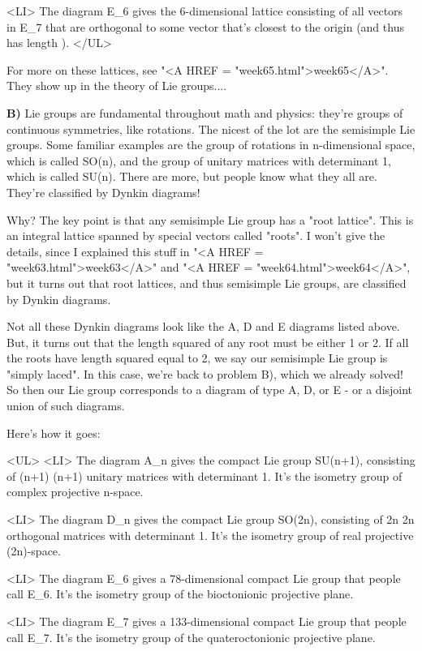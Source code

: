 <LI>
The diagram E_{6} gives the 6-dimensional lattice consisting
of all vectors in E_{7} that are orthogonal to some vector
that's closest to the origin (and thus has length ).
</UL>

For more on these lattices, see "<A HREF = "week65.html">week65</A>".
They show up in the theory of Lie groups....

\textbf{B)} Lie groups are fundamental throughout math and physics: they're
groups of continuous symmetries, like rotations.  The nicest of the
lot are the semisimple Lie groups.  Some familiar examples are the 
group of rotations in n-dimensional space, which is called SO(n), 
and the group of unitary matrices with determinant 1, which is 
called SU(n).  There are more, but people know what they all are.
They're classified by Dynkin diagrams!  

Why?  The key point is that any semisimple Lie group 
has a "root lattice".  
This is an integral lattice spanned by special vectors 
called "roots".  
I won't give the details, since I explained this 
stuff in "<A HREF = "week63.html">week63</A>" 
and "<A HREF = "week64.html">week64</A>", but it turns out 
that root lattices, and thus semisimple 
Lie groups, are classified by Dynkin diagrams.  

Not all these Dynkin diagrams look like the A, D and E diagrams listed
above.  But, it turns out that the length squared of any root must be 
either 1 or 2.  If all the roots have length squared equal to 2, we
say our semisimple Lie group is "simply laced".  In this case, we're
back to problem B), which we already solved!  So then our Lie group 
corresponds to a diagram of type A, D, or E - or a disjoint union of 
such diagrams.

Here's how it goes:

<UL>
<LI>
 The diagram A_{n} gives the compact Lie group SU(n+1), 
  consisting of (n+1) \times  (n+1) unitary matrices with determinant 1.  
  It's the isometry group of complex projective n-space.

<LI>
 The diagram D_{n} gives the compact Lie group SO(2n), 
  consisting of 2n \times  2n orthogonal matrices with determinant 1.
  It's the isometry group of real projective (2n)-space.

<LI>
 The diagram E_{6} gives a 78-dimensional compact Lie group
  that people call E_{6}.  It's the isometry group of the bioctonionic
  projective plane.

<LI>
 The diagram E_{7} gives a 133-dimensional compact Lie group
  that people call E_{7}.  It's the isometry group of the quateroctonionic
  projective plane.

